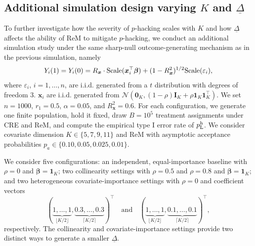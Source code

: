 \documentclass[12pt]{article}
\newcommand{\bs}{\boldsymbol}
\newcommand{\hpL}{p_\textnormal{L}^{\textnormal{h}}}
\newcommand{\lx}[1]{#1}
\begin{document}



\subsection{\lx{Additional simulation design varying $K$ and $\underline{\Delta}$}}
To further investigate how the severity of $p$-hacking scales with
$K$ and how $\underline{\Delta}$ affects the ability of ReM to mitigate
$p$-hacking, we conduct an additional simulation study under the same sharp-null
outcome-generating mechanism as in the previous simulation, namely
\[
Y_i(1) = Y_i(0)  = R_{\bs{x}} \cdot \textnormal{Scale}(\bs{x}_i^\top \bs{\beta}) + (1-R_{\bs{x}}^2)^{1/2}\textnormal{Scale}(\varepsilon_i),
\]
where  $\varepsilon_i$, $i=1,\ldots,n$, are i.i.d. generated from a $t$ distribution with degrees of freedom $3$. $\bs{x}_i$ are i.i.d. generated from $\mathcal{N}(\bs{0}_K, (1-\rho)\bs{I}_K + \rho \bs{1}_K\bs{1}_K^\top)$. 
 We set
$n=1000$, $r_1=0.5$, $\alpha=0.05$, and
$R^2_{\bs{x}}=0.6$. For each configuration, we generate one finite
population, hold it fixed, draw $B=10^5$ treatment assignments under
CRE and ReM, and compute the empirical type I error rate of $\hpL$. We consider covariate dimension $K\in\{5,7,9,11\}$ and ReM with asymptotic
acceptance probabilities
$p_a\in\{0.10,0.05,0.025,0.01\}$.


We consider five configurations: an independent, equal-importance
baseline with $\rho=0$ and $\bs{\beta}=\bs{1}_K$; two collinearity
settings with $\rho=0.5$ and $\rho=0.8$ and
$\bs{\beta}=\bs{1}_K$; and two heterogeneous covariate-importance
settings with $\rho=0$ and coefficient vectors
\[
(\underbrace{1,\ldots,1}_{\lfloor K/2\rfloor},
\underbrace{0.3,\ldots,0.3}_{\lceil K/2\rceil})^\top
\quad\text{and}\quad
(\underbrace{1,\ldots,1}_{\lfloor K/2\rfloor},
\underbrace{0.1,\ldots,0.1}_{\lceil K/2\rceil})^\top,
\]
respectively. The collinearity and covariate-importance settings provide two distinct
ways to generate a smaller $\underline{\Delta}$.
\end{document}
